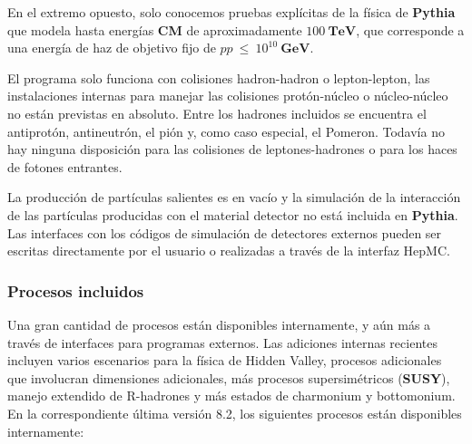 En el extremo opuesto, solo conocemos pruebas explícitas de la física de \textbf{Pythia} que modela hasta energías \textbf{CM} de aproximadamente $100 ~ \mathbf{TeV}$, que corresponde a una energía de haz de objetivo fijo de $pp~\leq~10^{10} ~ \mathbf{GeV}$. 

El programa solo funciona con colisiones hadron-hadron o lepton-lepton, las instalaciones internas para manejar las colisiones protón-núcleo o núcleo-núcleo no están previstas en absoluto. Entre los hadrones incluidos se encuentra el antiprotón, antineutrón, el pión y, como caso especial, el Pomeron. Todavía no hay ninguna disposición para las colisiones de leptones-hadrones o para los haces de fotones entrantes.

La producción de partículas salientes es en vacío y la simulación de la interacción de las partículas producidas con el material detector no está incluida en \textbf{Pythia}. Las interfaces con los códigos de simulación de detectores externos pueden ser escritas directamente por el usuario o realizadas a través de la interfaz HepMC.

\subsubsection{Procesos incluidos}

Una gran cantidad de procesos están disponibles internamente, y aún más a través de interfaces para programas externos. Las adiciones internas recientes incluyen varios escenarios para la física de Hidden Valley, procesos adicionales que involucran dimensiones adicionales, más procesos supersimétricos (\textbf{SUSY}), manejo extendido de R-hadrones y más estados de charmonium y bottomonium. En la correspondiente última versión 8.2, los siguientes procesos están disponibles internamente:

